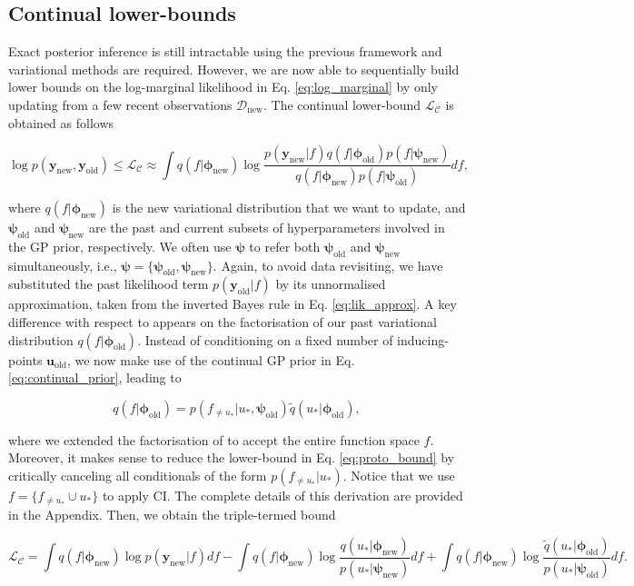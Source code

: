 \documentclass[]{article}
\def\u{{\mathbf u}}
\newcommand{\psiold}{{\bm{\psi}_{\text{old}}}}
\newcommand{\psinew}{{\bm{\psi}_{\text{new}}}}
\newcommand{\uold}{{\u_{\text{old}}}}
\newcommand{\Dcal}{\mathcal{D}}
\newcommand{\Lcal}{\mathcal{L}}
\newcommand{\yc}{\bm{y}}
\newcommand{\ycnew}{{\yc_{\text{new}}}}
\newcommand{\ycold}{{\yc_{\text{old}}}}
\newcommand{\phiold}{{\bm{\phi}_{\text{old}}}}
\newcommand{\phinew}{{\bm{\phi}_{\text{new}}}}
\begin{document}
\subsection{Continual lower-bounds}

Exact posterior inference is still intractable using the previous framework and variational methods are required. However, we are now able to sequentially build lower bounds on the log-marginal likelihood in Eq. \eqref{eq:log_marginal} by only updating from a few recent observations $\Dcal_{\text{new}}$. The continual lower-bound $\Lcal_\mathcal{C}$ is obtained as follows

\begin{equation}
	\label{eq:proto_bound}
	\log p(\ycnew, \ycold) \leq \Lcal_\mathcal{C} \approx  \int q(f|\phinew) \log \frac{p(\ycnew|f)q(f|\phiold)p(f|\psinew)}{q(f|\phinew)p(f|\psiold)}df,
\end{equation}

where $q(f|\phinew)$ is the new variational distribution that we want to update, and $\psiold$ and $\psinew$ are the past and current subsets of hyperparameters involved in the GP prior, respectively. We often use $\bm{\psi}$ to refer both  $\psiold$ and $\psinew$ simultaneously, i.e., $\bm{\psi} = \{\psiold, \psinew\}$. Again, to avoid data revisiting, we have substituted the past likelihood term $p(\ycold|f)$ by its unnormalised approximation, taken from the inverted Bayes rule in Eq. \eqref{eq:lik_approx}. A key difference with respect to \citet{bui2017streaming} appears on the factorisation of our past variational distribution $q(f|\phiold)$. Instead of conditioning on a fixed number of inducing-points $\uold$, we now make use of the continual GP prior in Eq. \eqref{eq:continual_prior}, leading to

\begin{equation}
	q(f|\phiold) = p(f_{\neq u_*}|u_*,\psiold)\widetilde{q}(u_*|\phiold),
\end{equation}

where we extended the factorisation of \citet{titsias2009variational} to accept the entire function space $f$. Moreover, it makes sense to reduce the lower-bound in Eq. \eqref{eq:proto_bound} by critically canceling all conditionals of the form $p(f_{\neq u_*}|u_*)$. Notice that we use $f = \{f_{\neq u_*} \cup u_*\}$ to apply CI. The complete details of this derivation are provided in the Appendix. Then, we obtain the triple-termed bound 

\begin{equation}
\label{eq:int_bound}
\Lcal_\mathcal{C} = \int q(f|\phinew)\log p(\ycnew|f)df - \int q(f|\phinew)\log \frac{q(u_*|\phinew)}{p(u_*|\psinew)}df \nonumber + \int q(f|\phinew)\log \frac{\widetilde{q}(u_*|\phiold)}{p(u_*|\psiold)}df.
\end{equation}
\end{document}
